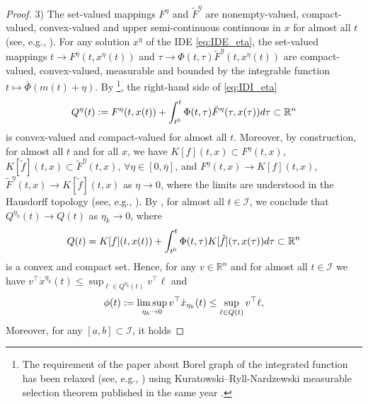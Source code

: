 \documentclass{article}
\newcommand{\R}{\mathbb{R}}
\begin{document}
\begin{proof}
{3)} The set-valued mappings $F^{\eta}$ and $\tilde F^{\eta}$ are nonempty-valued, compact-valued, convex-valued and upper semi-continuous continuous in $x$ for almost all $t$ (see, e.g., \cite[page 86]{Filippov1988:Book}).
{
 For any solution $x^{\eta}$ of the IDE \eqref{eq:IDE_eta}, the set-valued mappings $t\to F^{\eta}(t,x^{\eta}(t))$ and $\tau\to \Phi(t,\tau)\tilde F^{\eta}(t,x^{\eta}(t))$ are compact-valued, convex-valued, measurable and bounded by the integrable function $t\mapsto 
\bar\Phi(m(t)+\eta)$. 
}	
By {\cite[Theorems 1, 2 and 4]{Aumann1965:JMAA}}\footnote{The requirement of the paper \cite{Aumann1965:JMAA} about Borel graph of the integrated function  has  been relaxed 
	(see, e.g., \cite[Chapter 3]{CastaingValadier1977:Book})
	using Kuratowski--Ryll-Nardzewski measurable selection theorem published in the same year \cite{KuratowskiRyll-Nardzewski1965:BAPC}.},
the right-hand side of \eqref{eq:IDI_eta} \vspace{-1mm}
\[
 Q^{\eta}(t):=F^{\eta}(t,x(t))+\int^t_{t^0} \Phi(t,\tau) \tilde F^{\eta}(\tau,x(\tau)) d\tau \subset \R^n\vspace{-1mm}
\]
is convex-valued and compact-valued {for almost all $t$.
Moreover, by construction, for almost all $t$ and for all $x$, we have  $K[f](t,x)\subset F^{\eta}(t,x)$,  $K[\tilde f](t,x)\subset \tilde F^{\eta}(t,x)$, $\forall \eta\in [0,\overline{\eta}]$, and  $F^{\eta}(t,x)\to K[f](t,x)$, $\tilde F^{\eta}(t,x)\to K[\tilde f](t,x)$  as $\eta \to 0$, where the limits are understood in the Hausdorff topology (see, e.g., \cite[\S 5]{Filippov1988:Book}).
By \cite[Theprem 5]{Aumann1965:JMAA}, for almost all $t\in \mathcal{I}$, we conclude that $Q^{\eta_{k}}(t)\to Q(t)$ as $\eta_k\to 0$,} 
where    \vspace{-1mm}
\[
Q(t)=K[f](t,x(t))+\int^t_{t^0} \Phi(t,\tau) K[\tilde f](\tau,x(\tau)) d\tau \subset \R^n\vspace{-1mm}
\]
is  a convex and compact set.
Hence, for any 
 $v\in \R^n$ and for almost all $t\in\mathcal{I}$ we have\vspace{-1mm}
{ $
v^{\top} \dot x^{\eta_k}(t) \leq \sup_{\ell \in Q^{\eta_{k}}(t)}v^{\top}\ell
 $ and }\vspace{-1mm}
\begin{equation}\label{eq:temp_proof}
 \phi(t):=\limsup_{\eta_k\to 0} v^{\top} \dot x_{\eta_k}(t)\leq \sup_{\ell \in Q(t)}v^{\top}\ell,\vspace{-2mm}
\end{equation}
Moreover, for any $[a,b]\subset \mathcal{I}$, it holds\vspace{-1mm}

\end{proof}
\end{document}
